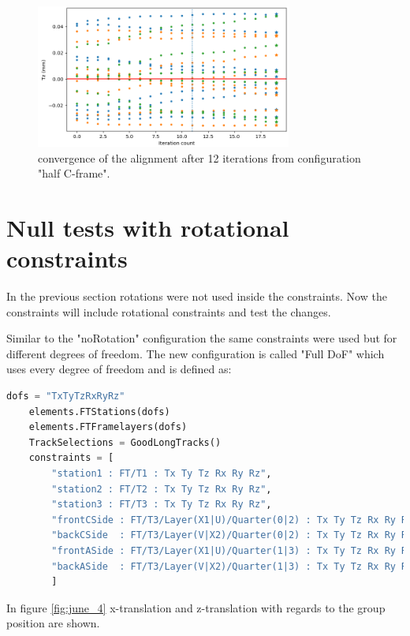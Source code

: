 \begin{figure}
  \centering
  \includegraphics[width=0.75\textwidth]{plots/scatter_fig_4_4_convergence.png}
  \caption{convergence of the alignment after 12 iterations from configuration "half C-frame".}
  \label{fig:conv}
\end{figure}

\section{Null tests with rotational constraints}
In the previous section rotations were not used inside the constraints. Now the constraints will include rotational constraints and test the changes.

Similar to the "noRotation" configuration the same constraints were used but for different degrees of freedom. The new configuration is called "Full DoF" which uses every degree of freedom and is defined as:

\begin{lstlisting}[language=Python]
    dofs = "TxTyTzRxRyRz"
    elements.FTStations(dofs)
    elements.FTFramelayers(dofs)
    TrackSelections = GoodLongTracks()
    constraints = [
        "station1 : FT/T1 : Tx Ty Tz Rx Ry Rz",
        "station2 : FT/T2 : Tx Ty Tz Rx Ry Rz",
        "station3 : FT/T3 : Tx Ty Tz Rx Ry Rz",
        "frontCSide : FT/T3/Layer(X1|U)/Quarter(0|2) : Tx Ty Tz Rx Ry Rz",
        "backCSide  : FT/T3/Layer(V|X2)/Quarter(0|2) : Tx Ty Tz Rx Ry Rz",
        "frontASide : FT/T3/Layer(X1|U)/Quarter(1|3) : Tx Ty Tz Rx Ry Rz",
        "backASide  : FT/T3/Layer(V|X2)/Quarter(1|3) : Tx Ty Tz Rx Ry Rz"
        ]
\end{lstlisting}

In figure \ref{fig:june_4} x-translation and z-translation with regards to the group position are shown.

